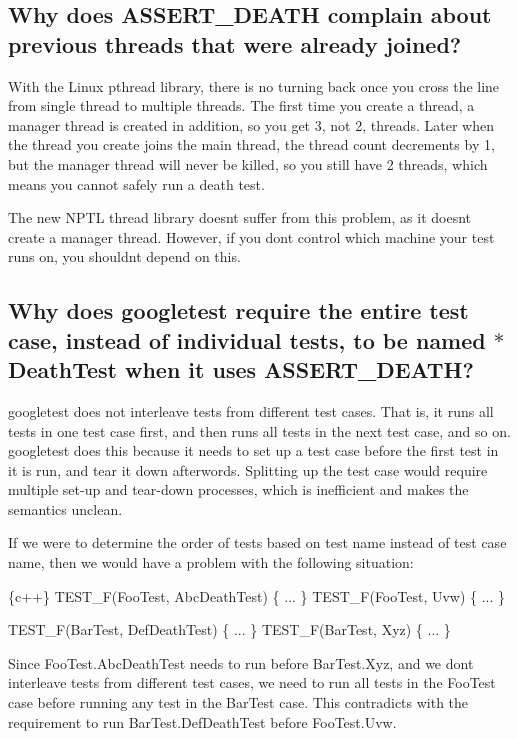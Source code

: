 \subsection*{Why does A\+S\+S\+E\+R\+T\+\_\+\+D\+E\+A\+TH complain about previous threads that were already joined?}

With the Linux pthread library, there is no turning back once you cross the line from single thread to multiple threads. The first time you create a thread, a manager thread is created in addition, so you get 3, not 2, threads. Later when the thread you create joins the main thread, the thread count decrements by 1, but the manager thread will never be killed, so you still have 2 threads, which means you cannot safely run a death test.

The new N\+P\+TL thread library doesn\textquotesingle{}t suffer from this problem, as it doesn\textquotesingle{}t create a manager thread. However, if you don\textquotesingle{}t control which machine your test runs on, you shouldn\textquotesingle{}t depend on this.

\subsection*{Why does googletest require the entire test case, instead of individual tests, to be named $\ast$\+Death\+Test when it uses A\+S\+S\+E\+R\+T\+\_\+\+D\+E\+A\+TH?}

googletest does not interleave tests from different test cases. That is, it runs all tests in one test case first, and then runs all tests in the next test case, and so on. googletest does this because it needs to set up a test case before the first test in it is run, and tear it down afterwords. Splitting up the test case would require multiple set-\/up and tear-\/down processes, which is inefficient and makes the semantics unclean.

If we were to determine the order of tests based on test name instead of test case name, then we would have a problem with the following situation\+:


\begin{DoxyCode}
\{c++\}
TEST\_F(FooTest, AbcDeathTest) \{ ... \}
TEST\_F(FooTest, Uvw) \{ ... \}

TEST\_F(BarTest, DefDeathTest) \{ ... \}
TEST\_F(BarTest, Xyz) \{ ... \}
\end{DoxyCode}


Since {\ttfamily Foo\+Test.\+Abc\+Death\+Test} needs to run before {\ttfamily Bar\+Test.\+Xyz}, and we don\textquotesingle{}t interleave tests from different test cases, we need to run all tests in the {\ttfamily Foo\+Test} case before running any test in the {\ttfamily Bar\+Test} case. This contradicts with the requirement to run {\ttfamily Bar\+Test.\+Def\+Death\+Test} before {\ttfamily Foo\+Test.\+Uvw}.

